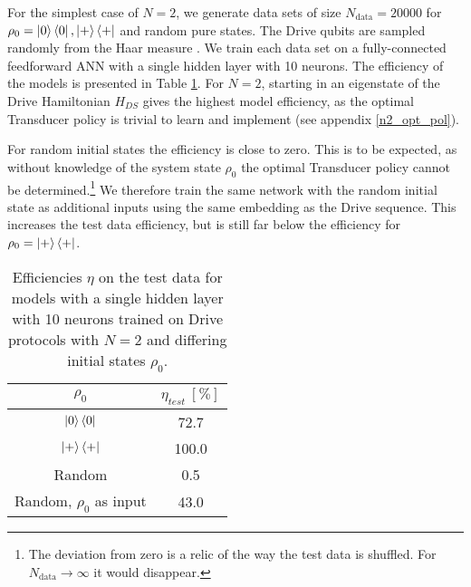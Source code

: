 For the simplest case of $N = 2$, we generate data sets of size $N_{\mathrm{data}} = 20000$ for $\rho_0 = \ket{0} \bra{0}, \ket{+} \bra{+}$ and random pure states.
The Drive qubits are sampled randomly from the Haar measure \cite{Mezzadri}.
We train each data set on a fully-connected feedforward ANN with a single hidden layer with 10 neurons.
The efficiency of the models is presented in Table \ref{n2efftable}.
For $N = 2$, starting in an eigenstate of the Drive Hamiltonian $H_{DS}$ gives the highest model efficiency, as the optimal Transducer policy is trivial to learn and implement (see appendix \ref{n2_opt_pol}).

For random initial states the efficiency is close to zero.
This is to be expected, as without knowledge of the system state $\rho_0$ the optimal Transducer policy cannot be determined.\footnote{The deviation from zero is a relic of the way the test data is shuffled. For $N_{\mathrm{data}} \to \infty$ it would disappear.}
We therefore train the same network with the random initial state as additional inputs using the same embedding as the Drive sequence.
This increases the test data efficiency, but is still far below the efficiency for $\rho_0 = \ket{+} \bra{+}$.


\begin{table}[h]
	\centering
	\begin{tabular}{ c | c }
		$\rho_0$ & $\eta_{test} \ [\%]$ \\
		\hline
		$\ket{0} \bra{0}$ & 72.7 \\
		$\ket{+} \bra{+}$ & 100.0 \\
		Random & 0.5 \\
		Random, $\rho_0$ as input & 43.0 \\
	\end{tabular}
	\caption{Efficiencies $\eta$ on the test data for models with a single hidden layer with 10 neurons trained on Drive protocols with $N = 2$ and differing initial states $\rho_0$.}
	\label{n2efftable}
\end{table}


